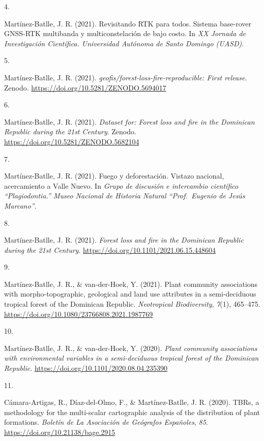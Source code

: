 \documentclass[10pt,a4paper,]{article}
\newlength{\cslhangindent}
\newlength{\csllabelwidth}
\newcommand{\CSLLeftMargin}[1]{\parbox[t]{\csllabelwidth}{\hfill #1~}}
\newcommand{\CSLRightInline}[1]{\parbox[t]{\linewidth - \cslhangindent - \csllabelwidth}{#1}\vspace{0.8ex}}
\begin{document}
\leavevmode\hypertarget{ref-Jose_Ramon_Martinez-Batlle_108106194}{}%
\CSLLeftMargin{4. }
\CSLRightInline{Martínez-Batlle, J. R. (2021). Revisitando RTK para
todos. Sistema base-rover GNSS-RTK multibanda y multiconstelación de
bajo costo. In \emph{XX Jornada de Investigación Científica. Universidad
Autónoma de Santo Domingo (UASD)}.}

\leavevmode\hypertarget{ref-https:ux2fux2fdoi.orgux2f10.5281ux2fzenodo.5694017}{}%
\CSLLeftMargin{5. }
\CSLRightInline{Martínez-Batlle, J. R. (2021).
\emph{geofis/forest-loss-fire-reproducible: First release}. Zenodo.
\url{https://doi.org/10.5281/ZENODO.5694017}}

\leavevmode\hypertarget{ref-https:ux2fux2fdoi.orgux2f10.5281ux2fzenodo.5682104}{}%
\CSLLeftMargin{6. }
\CSLRightInline{Martínez-Batlle, J. R. (2021). \emph{Dataset for: Forest
loss and fire in the Dominican Republic during the 21st Century}.
Zenodo. \url{https://doi.org/10.5281/ZENODO.5682104}}

\leavevmode\hypertarget{ref-Jose_Ramon_Martinez-Batlle_108096224}{}%
\CSLLeftMargin{7. }
\CSLRightInline{Martínez-Batlle, J. R. (2021). Fuego y deforestación.
Vistazo nacional, acercamiento a Valle Nuevo. In \emph{Grupo de
discusión e intercambio científico {``Plagiodontia.''} Museo Nacional de
Historia Natural {``Prof.~Eugenio de Jesús Marcano''}}.}

\leavevmode\hypertarget{ref-Batlle_2021}{}%
\CSLLeftMargin{8. }
\CSLRightInline{Martínez-Batlle, J. R. (2021). \emph{Forest loss and
fire in the Dominican Republic during the 21st Century}.
\url{https://doi.org/10.1101/2021.06.15.448604}}

\leavevmode\hypertarget{ref-Mart_nez_Batlle_2021}{}%
\CSLLeftMargin{9. }
\CSLRightInline{Martínez-Batlle, J. R., \& van-der-Hoek, Y. (2021).
Plant community associations with morpho-topographic, geological and
land use attributes in a semi-deciduous tropical forest of the Dominican
Republic. \emph{Neotropical Biodiversity}, \emph{7}(1), 465--475.
\url{https://doi.org/10.1080/23766808.2021.1987769}}

\leavevmode\hypertarget{ref-Martinez_Batlle_2020}{}%
\CSLLeftMargin{10. }
\CSLRightInline{Martínez-Batlle, J. R., \& van-der-Hoek, Y. (2020).
\emph{Plant community associations with environmental variables in a
semi-deciduous tropical forest of the Dominican Republic}.
\url{https://doi.org/10.1101/2020.08.04.235390}}

\leavevmode\hypertarget{ref-C_mara_Artigas_2020}{}%
\CSLLeftMargin{11. }
\CSLRightInline{Cámara-Artigas, R., Díaz-del-Olmo, F., \&
Martínez-Batlle, J. R. (2020). TBRs, a methodology for the multi-scalar
cartographic analysis of the distribution of plant formations.
\emph{Boletín de La Asociación de Geógrafos Españoles}, \emph{85}.
\url{https://doi.org/10.21138/bage.2915}}
\end{document}
